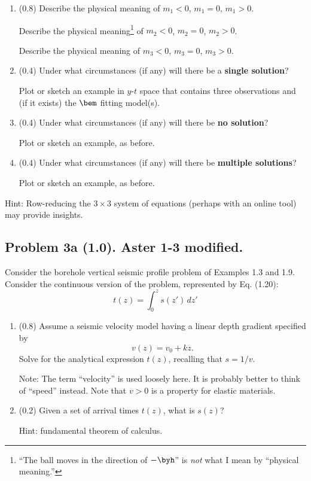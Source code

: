 \documentclass[11pt,titlepage,fleqn]{article}
\begin{document}
\begin{enumerate}
\item (0.8) Describe the physical meaning of $m_1 < 0$, $m_1 = 0$, $m_1 > 0$.

Describe the physical meaning\footnote{``The ball moves in the direction of $-\byh$'' is {\em not} what I mean by ``physical meaning.''} of $m_2 < 0$, $m_2 = 0$, $m_2 > 0$.

Describe the physical meaning of $m_3 < 0$, $m_3 = 0$, $m_3 > 0$.

\item (0.4) Under what circumstances (if any) will there be a {\bf single solution}?

Plot or sketch an example in $y$-$t$ space that contains three observations and (if it exists) the $\bem$ fitting model(s).

\item (0.4) Under what circumstances (if any) will there be {\bf no solution}?

Plot or sketch an example, as before.

\item (0.4) Under what circumstances (if any) will there be {\bf multiple solutions}?

Plot or sketch an example, as before.
\end{enumerate}
%
Hint: Row-reducing the $3 \times 3$ system of equations (perhaps with an online tool) may provide insights.



\subsection*{Problem 3a (1.0). Aster 1-3 modified.}

Consider the borehole vertical seismic profile problem of Examples 1.3 and 1.9. Consider the continuous version of the problem, represented by Eq. (1.20):
%
\begin{equation}
t(z) = \int_0^z s(z')\,dz'
\label{tz}
\end{equation}

\begin{enumerate}

\item (0.8) Assume a seismic velocity model having a linear depth gradient specified by
%
\begin{equation}
v(z) = v_0 + kz.
\label{vz}
\end{equation}
%
Solve for the analytical expression $t(z)$, recalling that $s = 1/v$.

Note: The term ``velocity'' is used loosely here. It is probably better to think of ``speed'' instead. Note that $v > 0$ is a property for elastic materials.


\item (0.2) Given a set of arrival times $t(z)$, what is $s(z)$?

Hint: fundamental theorem of calculus.

\end{enumerate}
\end{document}
